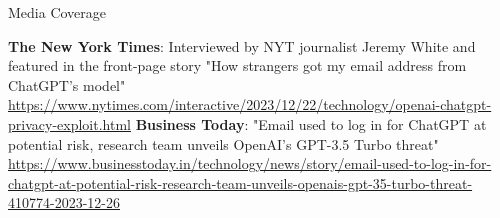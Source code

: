 
\begin{rubric}{Media Coverage}

\entry*[2023]
\textbf{The New York Times}: Interviewed by NYT journalist Jeremy White and featured in the front-page story "How strangers got my email address from ChatGPT's model"  \url{https://www.nytimes.com/interactive/2023/12/22/technology/openai-chatgpt-privacy-exploit.html}
\entry*[2023]
\textbf{Business Today}: "Email used to log in for ChatGPT at potential risk, research team unveils OpenAI's GPT-3.5 Turbo threat" \url{https://www.businesstoday.in/technology/news/story/email-used-to-log-in-for-chatgpt-at-potential-risk-research-team-unveils-openais-gpt-35-turbo-threat-410774-2023-12-26}
\end{rubric}

